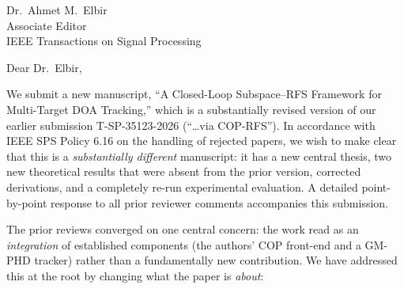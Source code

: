 \documentclass[11pt]{letter}
\begin{document}
\begin{letter}{Dr.\ Ahmet M.\ Elbir \\ Associate Editor \\ IEEE Transactions on Signal Processing}
\opening{Dear Dr.\ Elbir,}

We submit a new manuscript, ``A Closed-Loop Subspace--RFS Framework for
Multi-Target DOA Tracking,'' which is a substantially revised version of our earlier submission
T-SP-35123-2026 (``\ldots via COP-RFS''). In accordance with IEEE SPS Policy
6.16 on the handling of rejected papers, we wish to make clear that this is a
\emph{substantially different} manuscript: it has a new central thesis, two new
theoretical results that were absent from the prior version, corrected
derivations, and a completely re-run experimental evaluation. A detailed
point-by-point response to all prior reviewer comments accompanies this
submission.

The prior reviews converged on one central concern: the work read as an
\emph{integration} of established components (the authors' COP front-end and a
GM-PHD tracker) rather than a fundamentally new contribution. We have addressed
this at the root by changing what the paper is \emph{about}:


\end{letter}
\end{document}
